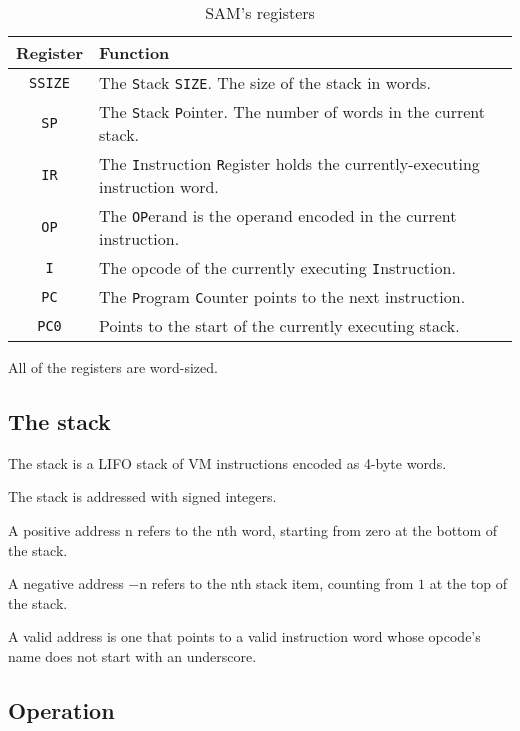 \documentclass[english]{scrartcl}
\newcommand{\spic}[1]{{\spfont\setlength{\baselineskip}{\normalbaselineskip}#1\/}}
\begin{document}
\begin{table}[htbp]
  \begin{center}
    \begin{tabular}{cp{3.5in}} \toprule
      \textbf{Register} & \textbf{Function} \\ \midrule
      {\tt SSIZE} & The {\tt S}tack {\tt SIZE}. The size of the stack in words. \\
      {\tt SP} & The {\tt S}tack {\tt P}ointer. The number of words in the current stack. \\
      {\tt IR} & The {\tt I}nstruction {\tt R}egister holds the currently-executing instruction word. \\
      {\tt OP} & The {\tt OP}erand is the operand encoded in the current instruction. \\
      {\tt I} & The opcode of the currently executing {\tt I}nstruction. \\
      {\tt PC} & The {\tt P}rogram {\tt C}ounter points to the next instruction. \\
      {\tt PC0} & Points to the start of the currently executing stack. \\
      \bottomrule
    \end{tabular}
    \caption{\label{regtable}SAM’s registers}
  \end{center}
\end{table}

All of the registers are word-sized.


\subsection{The stack}

The stack is a LIFO stack of VM instructions encoded as 4-byte words.

The stack is addressed with signed integers.

A positive address \spic{n} refers to the \spic{n}th word, starting from zero at the bottom of the stack.

A negative address $-$\spic{n} refers to the \spic{n}th stack item, counting from $1$ at the top of the stack.

A valid address is one that points to a valid instruction word whose opcode’s name does not start with an underscore.


\subsection{Operation}
\label{operation}
\end{document}
